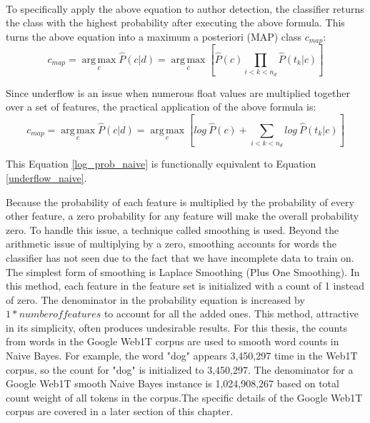 			\paragraph{} To specifically apply the above equation to author detection, the classifier returns the class with the highest probability after executing the above formula.  This turns the above equation into a maximum a posteriori (MAP) class $c_{map}$:
				\begin{equation}\label{underflow_naive} c_{map} = \operatorname*{arg\,max}_c \hat{P}(c|d) = \operatorname*{arg\,max}_c [ \hat{P}(c) \prod_{i<k<n_d} \hat{P}(t_k|c) ] \end{equation}

			Since underflow is an issue when numerous float values are multiplied together over a set of features, the practical application of the above formula is:
				\begin{equation}\label{log_prob_naive} c_{map} = \operatorname*{arg\,max}_c \hat{P}(c|d) = \operatorname*{arg\,max}_c [ log \: \hat{P}(c) + \sum_{i<k<n_d} log \: \hat{P}(t_k|c) ] \end{equation}
				
			This Equation \ref{log_prob_naive} is functionally equivalent to Equation \ref{underflow_naive}.
			
			Because the probability of each feature is multiplied by the probability of every other feature, a zero probability for any feature will make the overall probability zero.  To handle this issue, a technique called smoothing is used.  Beyond the arithmetic issue of multiplying by a zero, smoothing accounts for words the classifier has not seen due to the fact that we have incomplete data to train on. The simplest form of smoothing is Laplace Smoothing (Plus One Smoothing).  In this method, each feature in the feature set is initialized with a count of 1 instead of zero.  The denominator in the probability equation is increased by $1 * number of features$ to account for all the added ones.  This method, attractive in its simplicity, often produces undesirable results.  For this thesis, the counts from words in the Google Web1T corpus are used to smooth word counts in Naive Bayes.  For example, the word "dog" appears 3,450,297 time in the Web1T corpus, so the count for "dog" is initialized to 3,450,297.  The denominator for a Google Web1T smooth Naive Bayes instance is 1,024,908,267 based on total count weight of all tokens in the corpus.The specific details of the Google Web1T corpus are covered in a later section of this chapter.

